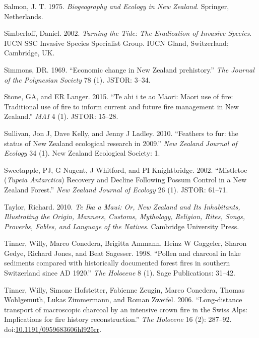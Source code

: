 \hypertarget{ref-Salmon1975}{}
Salmon, J. T. 1975. \emph{Biogeography and Ecology in New Zealand}.
Springer, Netherlands.

\hypertarget{ref-simberloff2002today}{}
Simberloff, Daniel. 2002. \emph{Turning the Tide: The Eradication of
Invasive Species}. IUCN SSC Invasive Species Specialist Group. IUCN
Gland, Switzerland; Cambridge, UK.

\hypertarget{ref-simmons1969economic}{}
Simmons, DR. 1969. ``Economic change in New Zealand prehistory.''
\emph{The Journal of the Polynesian Society} 78 (1). JSTOR: 3--34.

\hypertarget{ref-grace2015}{}
Stone, GA, and ER Langer. 2015. ``Te ahi i te ao Māori: Māori use of
fire: Traditional use of fire to inform current and future fire
management in New Zealand.'' \emph{MAI} 4 (1). JSTOR: 15--28.

\hypertarget{ref-sullivan2010feathers}{}
Sullivan, Jon J, Dave Kelly, and Jenny J Ladley. 2010. ``Feathers to
fur: the status of New Zealand ecological research in 2009.'' \emph{New
Zealand Journal of Ecology} 34 (1). New Zealand Ecological Society: 1.

\hypertarget{ref-sweetapple2002mistletoe}{}
Sweetapple, PJ, G Nugent, J Whitford, and PI Knightbridge. 2002.
``Mistletoe (\emph{Tupeia Antarctica}) Recovery and Decline Following
Possum Control in a New Zealand Forest.'' \emph{New Zealand Journal of
Ecology} 26 (1). JSTOR: 61--71.

\hypertarget{ref-taylor2010te}{}
Taylor, Richard. 2010. \emph{Te Ika a Maui: Or, New Zealand and Its
Inhabitants, Illustrating the Origin, Manners, Customs, Mythology,
Religion, Rites, Songs, Proverbs, Fables, and Language of the Natives}.
Cambridge University Press.

\hypertarget{ref-tinner1998}{}
Tinner, Willy, Marco Conedera, Brigitta Ammann, Heinz W Gaggeler, Sharon
Gedye, Richard Jones, and Beat Sagesser. 1998. ``Pollen and charcoal in
lake sediments compared with historically documented forest fires in
southern Switzerland since AD 1920.'' \emph{The Holocene} 8 (1). Sage
Publications: 31--42.

\hypertarget{ref-Tinner2006}{}
Tinner, Willy, Simone Hofstetter, Fabienne Zeugin, Marco Conedera,
Thomas Wohlgemuth, Lukas Zimmermann, and Roman Zweifel. 2006.
``Long-distance transport of macroscopic charcoal by an intensive crown
fire in the Swiss Alps: Implications for fire history reconstruction.''
\emph{The Holocene} 16 (2): 287--92.
doi:\href{https://doi.org/10.1191/0959683606hl925rr}{10.1191/0959683606hl925rr}.

